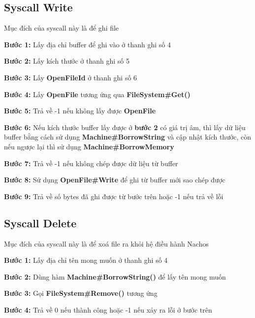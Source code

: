 \subsection{Syscall Write}
Mục đích của syscall này là để ghi file
\begin{addmargin}[40pt]{0pt}
\textbf{Bước 1: }Lấy địa chỉ buffer để ghi vào ở thanh ghi số 4
\end{addmargin}
\begin{addmargin}[40pt]{0pt}
\textbf{Bước 2: }Lấy kích thước ở thanh ghi số 5
\end{addmargin}
\begin{addmargin}[40pt]{0pt}
\textbf{Bước 3: }Lấy \textbf{OpenFileId} ở thanh ghi số 6
\end{addmargin}
\begin{addmargin}[40pt]{0pt}
\textbf{Bước 4: }Lấy \textbf{OpenFile} tương ứng qua \textbf{FileSystem\#Get()}
\end{addmargin}
\begin{addmargin}[40pt]{0pt}
\textbf{Bước 5: }Trả về -1 nếu không lấy được \textbf{OpenFile}
\end{addmargin}
\begin{addmargin}[40pt]{0pt}
\textbf{Bước 6: }Nếu kích thước buffer lấy được ở \textbf{bước 2} có giá trị âm, thì lấy dữ liệu buffer bằng cách sử dụng \textbf{Machine\#BorrowString} và cập nhật kích thước, còn nếu ngược lại thì sử dụng \textbf{Machine\#BorrowMemory}
\end{addmargin}
\begin{addmargin}[40pt]{0pt}
\textbf{Bước 7: }Trả về -1 nếu không chép được dữ liệu từ buffer
\end{addmargin}
\begin{addmargin}[40pt]{0pt}
\textbf{Bước 8: }Sử dụng \textbf{OpenFile\#Write} để ghi từ buffer mới sao chép được
\end{addmargin}
\begin{addmargin}[40pt]{0pt}
\textbf{Bước 9: }Trả về số bytes đã ghi được từ bước trên hoặc -1 nếu trả về lỗi
\end{addmargin}

\subsection{Syscall Delete}
Mục đích của syscall này là để xoá file ra khỏi hệ điều hành Nachos
\begin{addmargin}[40pt]{0pt}
\textbf{Bước 1: }Lấy địa chỉ tên mong muốn ở thanh ghi số 4
\end{addmargin}
\begin{addmargin}[40pt]{0pt}
\textbf{Bước 2: }Dùng hàm \textbf{Machine\#BorrowString()} để lấy tên mong muốn
\end{addmargin}
\begin{addmargin}[40pt]{0pt}
\textbf{Bước 3: }Gọi \textbf{FileSystem\#Remove()} tương ứng
\end{addmargin}
\begin{addmargin}[40pt]{0pt}
\textbf{Bước 4: }Trả về 0 nếu thành công hoặc -1 nếu xảy ra lỗi ở bước trên
\end{addmargin}

